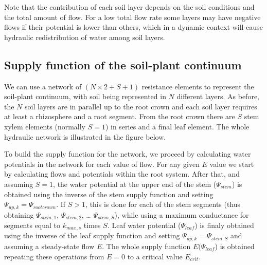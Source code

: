 \documentclass[]{book}
\begin{document}
Note that the contribution of each soil layer depends on the soil conditions and the total amount of flow. For a low total flow rate some layers may have negative flows if their potential is lower than others, which in a dynamic context will cause hydraulic redistribution of water among soil layers.

\hypertarget{supply-function-of-the-soil-plant-continuum}{%
\subsection{Supply function of the soil-plant continuum}\label{supply-function-of-the-soil-plant-continuum}}

We can use a network of \((N \times 2 + S + 1)\) resistance elements to represent the soil-plant continuum, with soil being represented in \(N\) different layers. As before, the \(N\) soil layers are in parallel up to the root crown and each soil layer requires at least a rhizosphere and a root segment. From the root crown there are \(S\) stem xylem elements (normally \(S = 1\)) in series and a final leaf element. The whole hydraulic network is illustrated in the figure below.

To build the supply function for the network, we proceed by calculating water potentials in the network for each value of flow. For any given \(E\) value we start by calculating flows and potentials within the root system. After that, and assuming \(S = 1\), the water potential at the upper end of the stem (\(\Psi_{stem}\)) is obtained using the inverse of the stem supply function and setting \(\Psi_{up,k}=\Psi_{rootcrown}\). If \(S > 1\), this is done for each of the stem segments (thus obtaining \(\Psi_{stem, 1}\), \(\Psi_{stem, 2}\), \ldots{} \(\Psi_{stem, S}\)), while using a maximum conductance for segments equal to \(k_{max,s}\) times \(S\). Leaf water potential (\(\Psi_{leaf}\)) is finaly obtained using the inverse of the leaf supply function and setting \(\Psi_{up,k}=\Psi_{stem, S}\) and assuming a steady-state flow \(E\). The whole supply function \(E(\Psi_{leaf}\)) is obtained repeating these operations from \(E=0\) to a critical value \(E_{crit}\).
\end{document}
